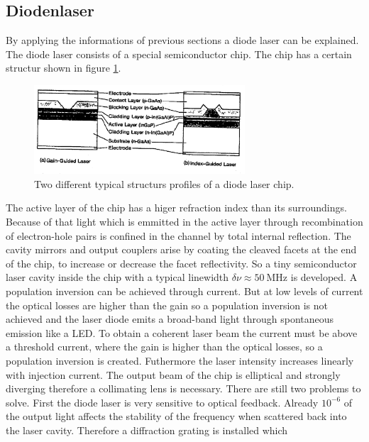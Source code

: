 \subsection{Diodenlaser}
\label{subsec:diodenlaser}
By applying the informations of previous sections
a diode laser can be explained.
The diode laser consists of a special semiconductor chip.
The chip has a certain structur shown in figure \ref{fig:chip}.
\begin{figure}
  \centering
  \includegraphics[width=0.7\textwidth]{chip.png}
  \caption{Two different typical structurs profiles of a diode laser chip.\cite{V61}}
  \label{fig:chip}
\end{figure}
The active layer of the chip has a higer refraction index than
its surroundings. Because of that light which is emmitted
in the active layer through recombination of electron-hole pairs
is confined in the channel by total internal reflection.
The cavity mirrors and output couplers arise
by coating the cleaved facets at the end of the chip,
to increase or decrease the facet reflectivity.
So a tiny semiconductor laser cavity inside the chip
with a typical linewidth
$\delta \nu \approx \SI{50}{\mega\hertz}$
is developed.
A population inversion
can be achieved through current.
But at low levels of current
the optical losses are higher than the gain
so a population inversion is not achieved and
the laser diode emits a broad-band light
through spontaneous emission
like a LED.
To obtain a coherent laser beam the current must be above
a threshold current, where the gain is higher than the
optical losses, so a population inversion is created.
Futhermore the laser intensity increases linearly with
injection current.
The output beam of the chip is elliptical and strongly diverging
therefore a collimating lens is necessary.
There are still two problems to solve.
First the diode laser is very sensitive to optical feedback.
Already $10^{-6}$ of the output light affects
the stability of the frequency
when scattered back into the
laser cavity.
Therefore a diffraction grating is installed which
